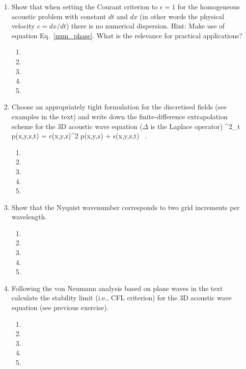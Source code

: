 \begin{enumerate}
\begin{enumerate}
\item[] 
\end{enumerate}
\item 
Show that when setting the Courant criterion to $\epsilon=1$ for the homogeneous acoustic problem with constant $dt$ and $dx$ (in other words the physical velocity $c=dx/dt$) there is no numerical dispersion. 
Hint: Make use of equation Eq.~\ref{num_phase}. What is the relevance for practical applications?
\begin{enumerate}
\item[]
\item[]
\item[] 
\item[]
\item[] 
\end{enumerate}
\item
Choose an appropriately tight formulation for the discretised fields (see examples in the text) and write down the finite-difference extrapolation scheme for the 3D acoustic wave equation ($\Delta$ is the Laplace operator) 
\be
\partial^2_t p(x,y,z,t) = c(x,y,z)^2 \Delta p(x,y,z) + s(x,y,z,t) \ . 
\nonumber
\ee 
\begin{enumerate}
\item[]
\item[]
\item[] 
\item[]
\item[] 
\end{enumerate}
\item
Show that the Nyquist wavenumber corresponds to two grid increments per wavelength. 
\begin{enumerate}
\item[]
\item[]
\item[] 
\item[]
\item[] 
\end{enumerate}
\item
Following the von Neumann analysis based on plane waves in the text calculate the stability limit (i.e., CFL criterion) for the 3D acoustic wave equation (see previous exercise). 
\begin{enumerate}
\item[]
\item[]
\item[] 
\item[]
\item[] 

\end{enumerate}
\end{enumerate}

